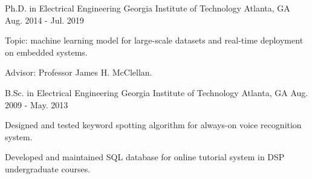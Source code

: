 

\begin{cventries}

	\cventry
		{Ph.D. in Electrical Engineering} %
		{Georgia Institute of Technology} %
		{Atlanta, GA} %
		{Aug. 2014 - Jul. 2019} %
		{
			\begin{cvitems} %
				\item {Topic: machine learning model for large-scale datasets and real-time deployment on embedded systems.}
				\item {Advisor: Professor James H. McClellan.}
			\end{cvitems}
		}
		
	\cventry
		{B.Sc. in Electrical Engineering} %
		{Georgia Institute of Technology} %
		{Atlanta, GA} %
		{Aug. 2009 - May. 2013} %
		{
			\begin{cvitems} %
				\item {Designed and tested keyword spotting algorithm for always-on voice recognition system.}
				\item {Developed and maintained SQL database for online tutorial system in DSP undergraduate courses.}
			\end{cvitems}
		}

\end{cventries}
